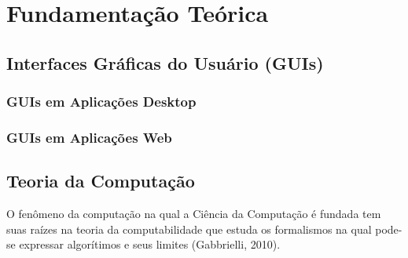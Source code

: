 \section{Fundamentação Teórica}
\label{sec:fund-teor}

\subsection{Interfaces Gráficas do Usuário (GUIs)}
\label{sec:guis}

\subsubsection{GUIs em Aplicações Desktop}
\label{sec:guis-desktop}


\subsubsection{GUIs em Aplicações Web}
\label{sec:guis-web}

%
%

\subsection{Teoria da Computação}
\label{sec:teoria-da-computacao}

O fenômeno da computação na qual a Ciência da Computação é fundada tem suas
raízes na teoria da computabilidade que estuda os formalismos na qual pode-se
expressar algorítimos e seus limites (Gabbrielli, 2010).


